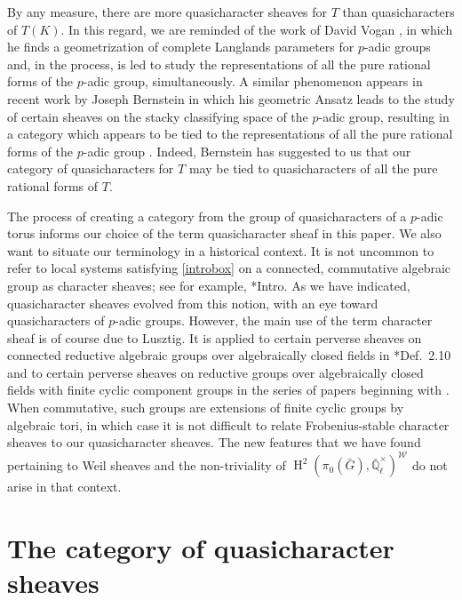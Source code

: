 \documentclass[CM,Submssn,SecEq]{degruyter-crelle} %
\theoremstyle{plain}
\theoremstyle{definition}
\theoremstyle{remark}
\newcommand{\EE}{\mathbb{\bar Q}_\ell}
\newcommand{\EEx}{\EE^\times}
\newcommand{\Weil}[1]{\mathcal{W}_{#1}}
\DeclareMathOperator{\Hh}{H}
\begin{document}
By any measure, there are more quasicharacter sheaves for $T$ than quasicharacters of $T(K)$.  
In this regard, we are reminded of the work of David Vogan \cite{vogan:93a}, in which he finds a geometrization of complete Langlands parameters for $p$-adic groups 
and, in the process, is led to study the representations of all the pure rational forms of the $p$-adic group, simultaneously.
A similar phenomenon appears in recent work by Joseph Bernstein in which his geometric Ansatz leads to the study of certain sheaves on the stacky classifying space of the $p$-adic group, resulting in a category which appears to be tied to the representations of all the pure rational forms of the $p$-adic group \cite{bernstein:vogan_conference}.
Indeed, Bernstein has suggested to us that our category of quasicharacters for $T$ may be tied to quasicharacters of all the pure rational forms of $T$.

The process of creating a category from the group of quasicharacters of a $p$-adic  torus informs our choice of the term quasicharacter sheaf in this paper.
We also want to situate our terminology in a historical context.
It is not uncommon to refer to local systems satisfying \eqref{introbox} on a connected, commutative algebraic group as character sheaves;
see for example, \cite{kamgarpour:09a}*{Intro}.
As we have indicated, quasicharacter sheaves evolved from this notion,
with an eye toward quasicharacters of $p$-adic groups.
However, the main use of the term character sheaf is of course due to Lusztig.
It is applied to certain perverse sheaves on connected reductive algebraic groups over algebraically closed fields in
\cite{lusztig:85a}*{Def.~2.10} and to certain perverse sheaves on reductive groups
over algebraically closed fields with finite cyclic component groups in the series of papers
beginning with \cite{lusztig:disconnected1}.
When commutative, such groups are extensions of finite cyclic groups by algebraic tori,
in which case it is not difficult to relate Frobenius-stable character sheaves to our quasicharacter sheaves.
The new features that we have found pertaining to Weil sheaves and the non-triviality of $\Hh^2(\pi_0({\bar G}),\EEx)^{\Weil{}}$ do not arise in that context.


\section{The category of quasicharacter sheaves} \label{sec:category}
\end{document}
